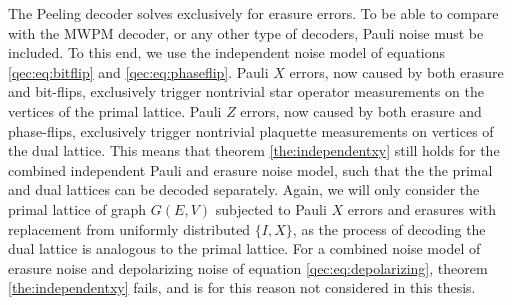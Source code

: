 The Peeling decoder solves exclusively for erasure errors. To be able to compare with the MWPM decoder, or any other type of decoders, Pauli noise must be included. To this end, we use the independent noise model of equations \eqref{qec:eq:bitflip} and \eqref{qec:eq:phaseflip}. Pauli $X$ errors, now caused by both erasure and bit-flips, exclusively trigger nontrivial star operator measurements on the vertices of the primal lattice. Pauli $Z$ errors, now caused by both erasure and phase-flips, exclusively trigger nontrivial plaquette measurements on vertices of the dual lattice. This means that theorem \ref{the:independentxy} still holds for the combined independent Pauli and erasure noise model, such that the the primal and dual lattices can be decoded separately. Again, we will only consider the primal lattice of graph $G(E,V)$ subjected to Pauli $X$ errors and erasures with replacement from uniformly distributed $\{I,X\}$, as the process of decoding the dual lattice is analogous to the primal lattice. For a combined noise model of erasure noise and depolarizing noise of equation \eqref{qec:eq:depolarizing}, theorem \ref{the:independentxy} fails, and is for this reason not considered in this thesis.


